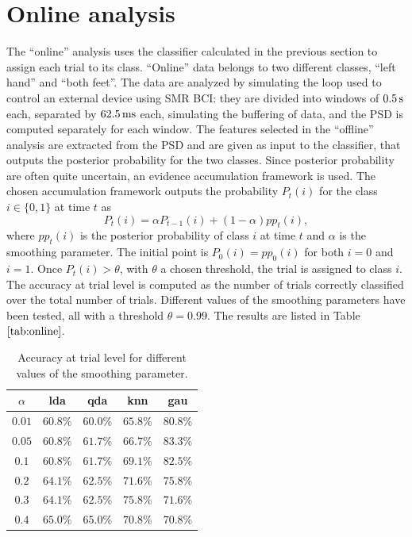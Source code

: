 \section{Online analysis}
The ``online'' analysis uses the classifier calculated in the previous section to assign each trial to its class.
``Online'' data belongs to two different classes, ``left hand'' and ``both feet''.
The data are analyzed by simulating the loop used to control an external device using SMR BCI: they are divided into windows of $\unit[0.5]{s}$ each, separated by $\unit[62.5]{ms}$ each, simulating the buffering of data, and the PSD is computed separately for each window.
The features selected in the ``offline'' analysis are extracted from the PSD and are given as input to the classifier, that outputs the posterior probability for the two classes.
Since posterior probability are often quite uncertain, an evidence accumulation framework is used.
The chosen accumulation framework outputs the probability $P_t(i)$ for the class $i \in \{0,1\}$ at time $t$ as
\begin{equation}
   P_t(i) = \alpha P_{t-1}(i) + (1-\alpha) pp_t(i),
   \label{eq:accum}
\end{equation}
where $pp_t(i)$ is the posterior probability of class $i$ at time $t$ and $\alpha$ is the smoothing parameter.
The initial point is $P_0(i) = pp_0(i)$ for both $i=0$ and $i=1$.
Once $P_t(i) > \theta$, with $\theta$ a chosen threshold, the trial is assigned to class $i$. \\
The accuracy at trial level is computed as the number of trials correctly classified over the total number of trials.
Different values of the smoothing parameters have been tested, all with a threshold $\theta = 0.99$.
The results are listed in Table $\ref{tab:online}$.
\begin{table}
   \centering
   \begin{tabular}{|c|cccc|}
      \hline
      $\alpha$ & lda      & qda      & knn      & gau     \\
      \hline
      $0.01$  & $60.8\%$ & $60.0\%$ & $65.8\%$ & $80.8\%$ \\
      $0.05$  & $60.8\%$ & $61.7\%$ & $66.7\%$ & $83.3\%$ \\
      $0.1$   & $60.8\%$ & $61.7\%$ & $69.1\%$ & $82.5\%$ \\
      $0.2$   & $64.1\%$ & $62.5\%$ & $71.6\%$ & $75.8\%$ \\
      $0.3$   & $64.1\%$ & $62.5\%$ & $75.8\%$ & $71.6\%$ \\
      $0.4$   & $65.0\%$ & $65.0\%$ & $70.8\%$ & $70.8\%$ \\
      \hline
   \end{tabular}
   \caption{Accuracy at trial level for different values of the smoothing parameter.}
   \label{tab:online}
\end{table}
